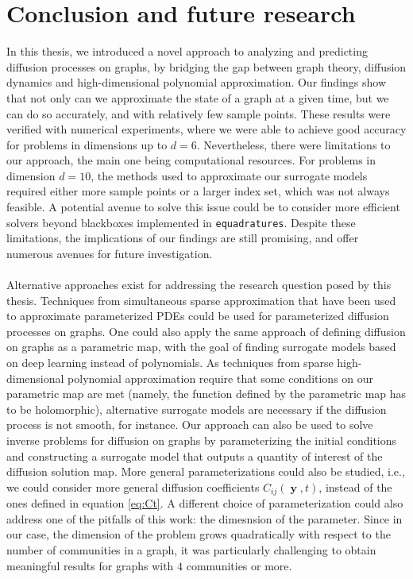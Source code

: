 \documentclass[12pt, oneside]{report}   	%
\DeclareMathOperator{\y}{\boldsymbol{y}}
\begin{document}
\newpage

\chapter{Conclusion and future research}
\label{chap:conclusion}


In this thesis, we introduced a novel approach to analyzing and predicting diffusion processes on graphs, by bridging the gap between graph theory, diffusion dynamics and high-dimensional polynomial approximation. Our findings show that not only can we approximate the state of a graph at a given time, but we can do so accurately, and with relatively few sample points. These results were verified with numerical experiments, where we were able to achieve good accuracy for problems in dimensions up to $d=6$. Nevertheless, there were limitations to our approach, the main one being computational resources. For problems in dimension $d=10$, the methods used to approximate our surrogate models required either more sample points or a larger index set, which was not always feasible. A potential avenue to solve this issue could be to consider more efficient solvers beyond blackboxes implemented in \texttt{equadratures}. Despite these limitations, the implications of our findings are still promising, and offer numerous avenues for future investigation. \\\\
Alternative approaches exist for addressing the research question posed by this thesis. Techniques from simultaneous sparse approximation that have been used to approximate parameterized PDEs \cite{dexter2019mixed} could be used for parameterized diffusion processes on graphs. One could also apply the same approach of defining diffusion on graphs as a parametric map, with the goal of finding surrogate models based on deep learning instead of polynomials. As techniques from sparse high-dimensional polynomial approximation require that some conditions on our parametric map are met (namely, the function defined by the parametric map has to be holomorphic), alternative surrogate models are necessary if the diffusion process is not smooth, for instance. Our approach can also be used to solve inverse problems for diffusion on graphs by parameterizing the initial conditions and constructing a surrogate model that outputs a quantity of interest of the diffusion solution map. More general parameterizations could also be studied, i.e., we could consider more general diffusion coefficients $C_{ij}(\y,t)$, instead of the ones defined in equation \eqref{eq:Ct}. A different choice of parameterization could also address one of the pitfalls of this work: the dimesnsion of the parameter. Since in our case, the dimension of the problem grows quadratically with respect to the number of communities in a graph, it was particularly challenging to obtain meaningful results for graphs with $4$ communities or more.\\\\
\end{document}
